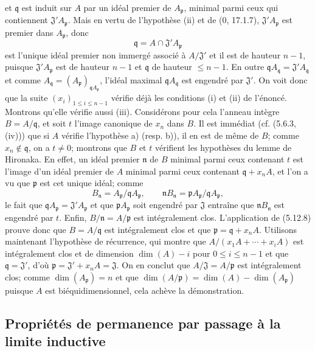 \documentclass[10pt,oneside]{book}
\begin{document}
et $\mathfrak q$ est induit sur $A$ par un idéal premier de
$A_{\mathfrak p}$, minimal parmi ceux qui contiennent
$\mathfrak J'A_{\mathfrak p}$. Mais en vertu de l'hypothèse (ii) et de (0,
17.1.7), $\mathfrak J'A_{\mathfrak p}$ est premier dans $A_{\mathfrak p}$,
donc
\[
\mathfrak q=A\cap\mathfrak J'A_{\mathfrak p}
\]
est l'unique idéal premier non immergé associé à $A/\mathfrak J'$ et il est de
hauteur $n-1$, puisque $\mathfrak J'A_{\mathfrak p}$ est de hauteur $n-1$ et
$\mathfrak q$ de hauteur $\leq n-1$. En outre
$\mathfrak qA_{\mathfrak q}=\mathfrak J'A_{\mathfrak q}$ et comme
$A_{\mathfrak q}=(A_{\mathfrak p})_{\mathfrak qA_{\mathfrak p}}$, l'idéal
maximal $\mathfrak qA_{\mathfrak q}$ est engendré par $\mathfrak J'$. On voit
donc que la suite $(x_i)_{1\leq i\leq n-1}$ vérifie déjà les conditions (i) et
(ii) de l'énoncé. Montrons qu'elle vérifie aussi (iii). Considérons pour cela
l'anneau intègre $B=A/\mathfrak q$, et soit $t$ l'image canonique de $x_n$ dans
$B$. Il est immédiat (cf. (5.6.3, (iv))) que si $A$ vérifie l'hypothèse a)
(resp. b)), il en est de même de $B$; comme $x_n\notin\mathfrak q$, on a
$t\neq0$; montrons que $B$ et $t$ vérifient les hypothèses du lemme de
Hironaka. En effet, un idéal premier $\mathfrak n$ de $B$ minimal parmi ceux
contenant $t$ est l'image d'un idéal premier de $A$ minimal parmi ceux
contenant $\mathfrak q+x_nA$, et l'on a vu que $\mathfrak p$ est cet unique
idéal; comme
\[
B_{\mathfrak n}=A_{\mathfrak p}/\mathfrak qA_{\mathfrak p},\qquad
\mathfrak nB_{\mathfrak n}
=\mathfrak pA_{\mathfrak p}/\mathfrak qA_{\mathfrak p},
\]
le fait que $\mathfrak qA_{\mathfrak p}=\mathfrak J'A_{\mathfrak p}$ et que
$\mathfrak pA_{\mathfrak p}$ soit engendré par $\mathfrak J$ entraîne que
$\mathfrak nB_{\mathfrak n}$ est engendré par $t$. Enfin,
$B/\mathfrak n=A/\mathfrak p$ est intégralement clos. L'application de
(5.12.8) prouve donc que $B=A/\mathfrak q$ est intégralement clos et que
$\mathfrak p=\mathfrak q+x_nA$. Utilisons maintenant l'hypothèse de récurrence,
qui montre que $A/(x_1A+\cdots+x_iA)$ est intégralement clos et de dimension
$\dim(A)-i$ pour $0\leq i\leq n-1$ et que $\mathfrak q=\mathfrak J'$, d'où
$\mathfrak p=\mathfrak J'+x_nA=\mathfrak J$. On en conclut que
$A/\mathfrak J=A/\mathfrak p$ est intégralement clos; comme
$\dim(A_{\mathfrak p})=n$ et que
$\dim(A/\mathfrak p)=\dim(A)-\dim(A_{\mathfrak p})$ puisque $A$ est
biéquidimensionnel, cela achève la démonstration.

\subsection{Propriétés de permanence par passage à la limite inductive}
\end{document}
